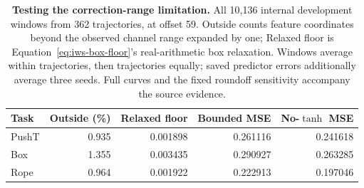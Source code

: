 \begin{table}[!htbp]\centering\small
\setlength{\tabcolsep}{5pt}
\begin{tabular}{@{}lrrrr@{}}
\toprule
Task & Outside (\%) & Relaxed floor & Bounded MSE & No-$\tanh$ MSE \\
\midrule
PushT & 0.935 & 0.001898 & 0.261116 & 0.241618 \\
Box & 1.355 & 0.003435 & 0.290927 & 0.263285 \\
Rope & 0.964 & 0.001922 & 0.222913 & 0.197046 \\
\bottomrule\end{tabular}
\caption{\textbf{Testing the correction-range limitation.} All 10,136 internal
development windows from 362 trajectories, at offset 59. Outside counts feature
coordinates beyond the observed channel range expanded by one; Relaxed floor
is Equation~\ref{eq:iws-box-floor}'s real-arithmetic box relaxation.
Windows average within trajectories, then trajectories equally; saved predictor
errors additionally average three seeds. Full curves and the fixed roundoff
sensitivity accompany the source evidence.}
\label{tab:iws-bound-diagnostic}\end{table}
